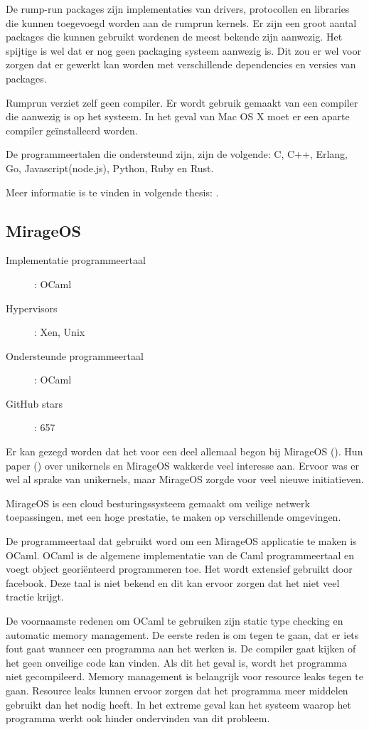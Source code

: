 De rump-run packages zijn implementaties van drivers, protocollen en libraries die kunnen toegevoegd worden aan de rumprun kernels. Er zijn een groot aantal packages die kunnen gebruikt wordenen de meest bekende zijn aanwezig.
Het spijtige is wel dat er nog geen packaging systeem aanwezig is. Dit zou er wel voor zorgen dat er gewerkt kan worden met verschillende dependencies en versies van packages.

Rumprun verziet zelf geen compiler. Er wordt gebruik gemaakt van een compiler die aanwezig is op het systeem. In het geval van Mac OS X moet er een aparte compiler geïnstalleerd worden.

De programmeertalen die ondersteund zijn, zijn de volgende: C, C++, Erlang, Go, Javascript(node.js), Python, Ruby en Rust.

Meer informatie is te vinden in volgende thesis: \cite{kantee_flexible_2012}.

\subsection{MirageOS}

\begin{description}
  \item [Implementatie programmeertaal]: OCaml
  \item [Hypervisors]: Xen, Unix
  \item [Ondersteunde programmeertaal]: OCaml
  \item [GitHub stars]: 657
\end{description}

Er kan gezegd worden dat het voor een deel allemaal begon bij MirageOS (\cite{mirage/mirage_0000}). Hun paper (\cite{madhavapeddy_unikernels_2013}) over unikernels en MirageOS wakkerde veel interesse aan. Ervoor was er wel al sprake van unikernels, maar MirageOS zorgde voor veel nieuwe initiatieven.

MirageOS is een cloud besturingssysteem gemaakt om veilige netwerk toepassingen, met een hoge prestatie, te maken op verschillende omgevingen.

De programmeertaal dat gebruikt word om een MirageOS applicatie te maken is OCaml.
OCaml is de algemene implementatie van de Caml programmeertaal en voegt object georiënteerd programmeren toe. Het wordt extensief gebruikt door facebook. Deze taal is niet bekend en dit kan ervoor zorgen dat het niet veel tractie krijgt.

De voornaamste redenen om OCaml te gebruiken zijn static type checking en automatic memory management. De eerste reden is om tegen te gaan, dat er iets fout gaat wanneer een programma aan het werken is. De compiler gaat kijken of het geen onveilige code kan vinden. Als dit het geval is, wordt het programma niet gecompileerd.
Memory management is belangrijk voor resource leaks tegen te gaan. Resource leaks kunnen ervoor zorgen dat het programma meer middelen gebruikt dan het nodig heeft. In het extreme geval kan het systeem waarop het programma werkt ook hinder ondervinden van dit probleem.


